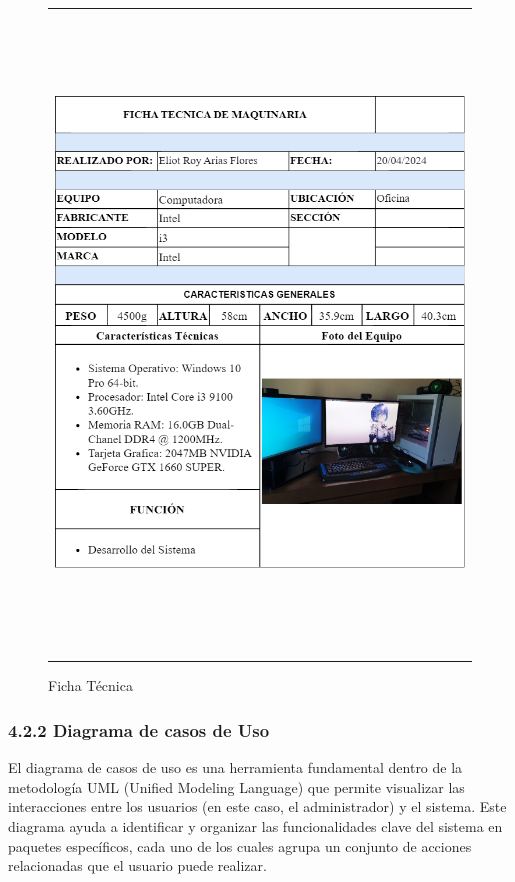 \begin{figure}[H]
    \caption{Ficha Técnica}
    \begin{tabular}{c}
        \includegraphics[width=16cm, height=17cm]{imagenes/cap4/FichaTecnica1.png}
    \end{tabular}
    \label{fig:fichaTecnica}
\end{figure}


\subsubsection*{4.2.2 Diagrama de casos de Uso}
El diagrama de casos de uso es una herramienta fundamental dentro de la metodología UML (Unified Modeling Language) que permite visualizar las interacciones entre los usuarios (en este caso, el administrador) y el sistema. Este diagrama ayuda a identificar y organizar las funcionalidades clave del sistema en paquetes específicos, cada uno de los cuales agrupa un conjunto de acciones relacionadas que el usuario puede realizar.

